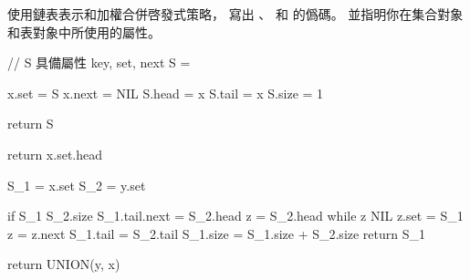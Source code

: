 \startEXERCISE
使用鏈表表示和加權合併啓發式策略，
寫出 、  和  的僞碼。
並指明你在集合對象和表對象中所使用的屬性。
\stopEXERCISE

\startANSWER
{}
\startCLRSCODE
// S 具備屬性 key, set, next
S = 

x.set = S
x.next = NIL
S.head = x
S.tail = x
S.size = 1

return S
\stopCLRSCODE

\startCLRSCODE
return x.set.head
\stopCLRSCODE

\startCLRSCODE
S_1 = x.set
S_2 = y.set

if S_1 \ge S_2.size
	S_1.tail.next = S_2.head
	z = S_2.head
	while z \ne NIL
		z.set = S_1
		z = z.next
	S_1.tail = S_2.tail
	S_1.size = S_1.size + S_2.size
	return S_1

return UNION(y, x)
\stopCLRSCODE

\stopANSWER